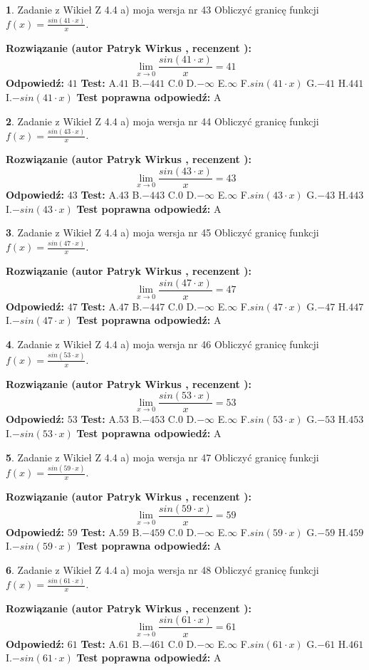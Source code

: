 \documentclass[12pt, a4paper]{article}
\theoremstyle{definition} %
\newtheorem{zad}{}
\newcommand{\zadStart}[1]{\begin{zad}#1\newline}
\newcommand{\zadStop}{\end{zad}}
\newcommand{\rozwStart}[2]{\noindent \textbf{Rozwiązanie (autor #1 , recenzent #2): }\newline}
\newcommand{\rozwStop}{\newline}
\newcommand{\odpStart}{\noindent \textbf{Odpowiedź:}\newline}
\newcommand{\odpStop}{\newline}
\newcommand{\testStart}{\noindent \textbf{Test:}\newline}
\newcommand{\testStop}{\newline}
\newcommand{\kluczStart}{\noindent \textbf{Test poprawna odpowiedź:}\newline}
\newcommand{\kluczStop}{\newline}
\begin{document}
\zadStart{Zadanie z Wikieł Z 4.4 a) moja wersja nr 43}
Obliczyć granicę funkcji $f(x)=\frac{sin(41\cdot x)}{x}$.
\zadStop
\rozwStart{Patryk Wirkus}{}
$$\lim\limits_{x\to 0}\frac{sin(41\cdot x)}{x}=
41$$
\rozwStop
\odpStart
$41$
\odpStop
\testStart
A.$41$
B.$-441$
C.$0$
D.$-\infty$
E.$\infty$
F.$sin(41\cdot x)$
G.$-41$
H.$441$
I.$-sin(41\cdot x)$
\testStop
\kluczStart
A
\kluczStop



\zadStart{Zadanie z Wikieł Z 4.4 a) moja wersja nr 44}
Obliczyć granicę funkcji $f(x)=\frac{sin(43\cdot x)}{x}$.
\zadStop
\rozwStart{Patryk Wirkus}{}
$$\lim\limits_{x\to 0}\frac{sin(43\cdot x)}{x}=
43$$
\rozwStop
\odpStart
$43$
\odpStop
\testStart
A.$43$
B.$-443$
C.$0$
D.$-\infty$
E.$\infty$
F.$sin(43\cdot x)$
G.$-43$
H.$443$
I.$-sin(43\cdot x)$
\testStop
\kluczStart
A
\kluczStop



\zadStart{Zadanie z Wikieł Z 4.4 a) moja wersja nr 45}
Obliczyć granicę funkcji $f(x)=\frac{sin(47\cdot x)}{x}$.
\zadStop
\rozwStart{Patryk Wirkus}{}
$$\lim\limits_{x\to 0}\frac{sin(47\cdot x)}{x}=
47$$
\rozwStop
\odpStart
$47$
\odpStop
\testStart
A.$47$
B.$-447$
C.$0$
D.$-\infty$
E.$\infty$
F.$sin(47\cdot x)$
G.$-47$
H.$447$
I.$-sin(47\cdot x)$
\testStop
\kluczStart
A
\kluczStop



\zadStart{Zadanie z Wikieł Z 4.4 a) moja wersja nr 46}
Obliczyć granicę funkcji $f(x)=\frac{sin(53\cdot x)}{x}$.
\zadStop
\rozwStart{Patryk Wirkus}{}
$$\lim\limits_{x\to 0}\frac{sin(53\cdot x)}{x}=
53$$
\rozwStop
\odpStart
$53$
\odpStop
\testStart
A.$53$
B.$-453$
C.$0$
D.$-\infty$
E.$\infty$
F.$sin(53\cdot x)$
G.$-53$
H.$453$
I.$-sin(53\cdot x)$
\testStop
\kluczStart
A
\kluczStop



\zadStart{Zadanie z Wikieł Z 4.4 a) moja wersja nr 47}
Obliczyć granicę funkcji $f(x)=\frac{sin(59\cdot x)}{x}$.
\zadStop
\rozwStart{Patryk Wirkus}{}
$$\lim\limits_{x\to 0}\frac{sin(59\cdot x)}{x}=
59$$
\rozwStop
\odpStart
$59$
\odpStop
\testStart
A.$59$
B.$-459$
C.$0$
D.$-\infty$
E.$\infty$
F.$sin(59\cdot x)$
G.$-59$
H.$459$
I.$-sin(59\cdot x)$
\testStop
\kluczStart
A
\kluczStop



\zadStart{Zadanie z Wikieł Z 4.4 a) moja wersja nr 48}
Obliczyć granicę funkcji $f(x)=\frac{sin(61\cdot x)}{x}$.
\zadStop
\rozwStart{Patryk Wirkus}{}
$$\lim\limits_{x\to 0}\frac{sin(61\cdot x)}{x}=
61$$
\rozwStop
\odpStart
$61$
\odpStop
\testStart
A.$61$
B.$-461$
C.$0$
D.$-\infty$
E.$\infty$
F.$sin(61\cdot x)$
G.$-61$
H.$461$
I.$-sin(61\cdot x)$
\testStop
\kluczStart
A
\kluczStop
\end{document}
